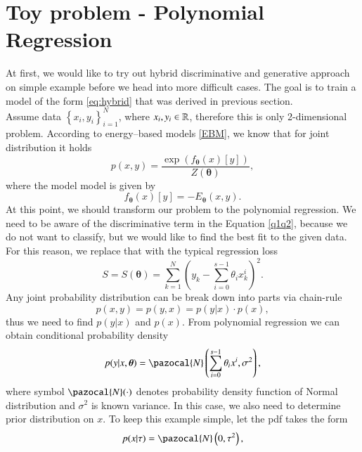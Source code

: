 \section{Toy problem - Polynomial Regression}
At first, we would like to try out hybrid discriminative and generative approach on simple example before we head into more difficult cases. The goal is to train a model of the form \eqref{eq:hybrid} that was derived in previous section.\\
Assume data $\left\lbrace x_i,y_i \right\rbrace_{i=1}^N$, where $x_i,y_i\in \mathbb{R}$, therefore this is only 2-dimensional problem.  According to energy--based models \ref{EBM}, we know that for joint distribution it holds
\begin{equation}
	p(x,y) = \frac{\exp{\left(f_{\boldsymbol{\theta}}(x)[y]\right)}}{Z(\boldsymbol{\theta})},
\end{equation}
where the model model is given by 
\begin{equation}
	f_{\boldsymbol{\theta}}(x)[y] = -E_{\boldsymbol{\theta}}(x,y) .
\end{equation}
At this point, we should transform our problem to the polynomial regression. We need to be aware of the discriminative term in the Equation \eqref{q1q2}, because we do not want to classify, but we would like to find the best fit to the given data. For this reason, we replace that with the typical regression loss
\begin{equation}\label{S(theta)}
	S = S(\boldsymbol{\theta}) = \sum_{k=1}^N \left(y_k - \sum_{i=0}^{s-1} \theta_i x^i_k\right)^2.
\end{equation}	
Any joint probability distribution can be break down into parts via chain-rule 
\begin{equation}\label{eq:chainrule}
	p(x,y) =	p(y,x) = p(y\vert x)\cdot p(x),
\end{equation}
thus we need to find $p(y\vert x)$ and $p(x)$. From polynomial regression we can obtain conditional probability density 
\begin{equation}\label{eq:linregpdf}
	p(y\vert x, \boldsymbol{\theta}) = \pazocal{N}\left(\sum_{i=0}^{s-1} \theta_i x^i, \sigma^2 \right),
\end{equation}
where symbol $\pazocal{N}(\cdot)$ denotes probability density function of Normal distribution and $\sigma^2$ is known variance. In this case, we also need to determine prior distribution on $x$. To keep this example simple, let the pdf takes the form
\begin{equation}\label{eq:tauprior}
	p(x|\tau) = \pazocal{N}\left(0, \tau^2\right),
\end{equation}
